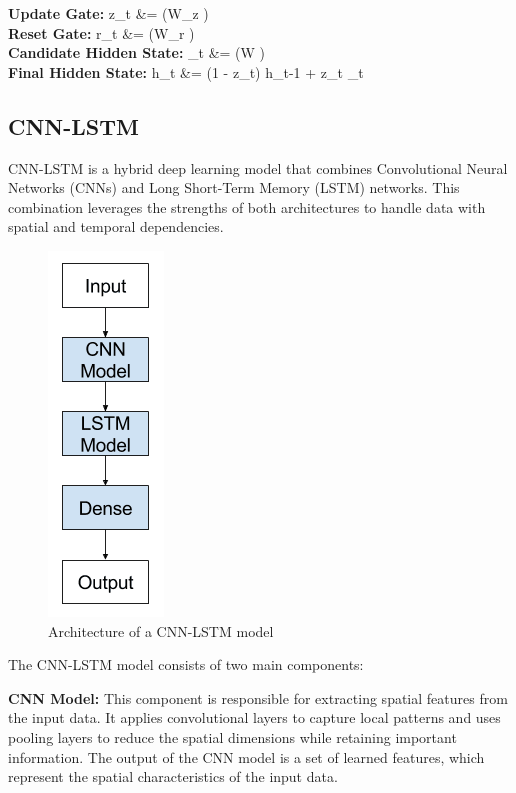 \documentclass[conference]{IEEEtran}
\begin{document}
\textbf{Update Gate:} \quad
z_t &= \sigma(W_z \cdot [h_{t-1}, x_t]) \\

\textbf{Reset Gate:} \quad
r_t &= \sigma(W_r \cdot [h_{t-1}, x_t]) \\

\textbf{Candidate Hidden State:} \quad
{}_t &= \tanh(W \cdot [r_t \circ h_{t-1}, x_t]) \\

\textbf{Final Hidden State:} \quad
h_t &= (1 - z_t) \circ h_{t-1} + z_t \circ {}_t


\subsection{CNN-LSTM}
CNN-LSTM is a hybrid deep learning model that combines Convolutional Neural Networks (CNNs) and Long Short-Term Memory (LSTM) networks. This combination leverages the strengths of both architectures to handle data with spatial and temporal dependencies.

\begin{figure}[htbp]
    \centering
    \includegraphics[height=0.3\textheight]{Figure/cnnlstm.png} %
    \caption{Architecture of a CNN-LSTM model}
    \label{fig:example}
\end{figure}

The CNN-LSTM model consists of two main components:

\textbf{CNN Model:} This component is responsible for extracting spatial features from the input data. It applies convolutional layers to capture local patterns and uses pooling layers to reduce the spatial dimensions while retaining important information. The output of the CNN model is a set of learned features, which represent the spatial characteristics of the input data.
\end{document}

